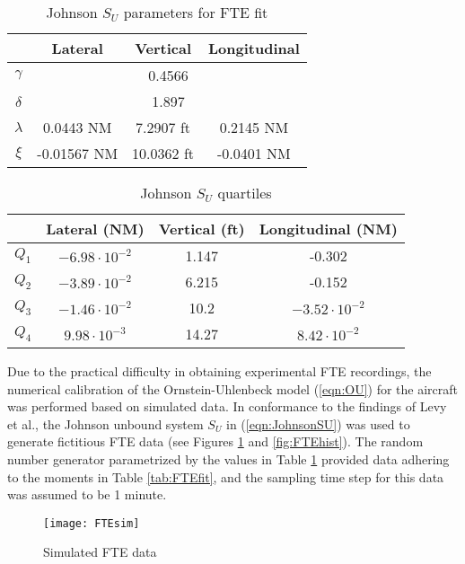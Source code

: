 \documentclass[conference]{IEEEtran}
\begin{document}
\begin{table}
\caption{Johnson $S_U$ parameters for FTE fit}
\label{tab:FTEparam}
\centering
\begin{tabular} {|c|c|c|c|}
\hline\hline
&Lateral&Vertical&Longitudinal \bigstrut\\ \hline\hline
$\gamma$ & \multicolumn{3}{c|}{0.4566} \bigstrut \\ \hline
$\delta$& \multicolumn{3}{c|}{1.897} \bigstrut \\ \hline
$\lambda$&0.0443 NM& 7.2907 ft& 0.2145 NM \bigstrut \\ \hline
$\xi$&-0.01567 NM& 10.0362 ft& -0.0401 NM \bigstrut \\ \hline\hline
\end{tabular}
\end{table}

\begin{table}
\caption{Johnson $S_U$ quartiles}
\label{tab:quant}
\centering
\begin{tabular} {|c|c|c|c|}
\hline\hline
& Lateral (NM) & Vertical (ft) & Longitudinal (NM)\bigstrut\\ \hline\hline
$Q_1$ & $-6.98\cdot10^{-2}$ & 1.147 & -0.302 \bigstrut \\ \hline
$Q_2$ & $-3.89\cdot10^{-2}$ & 6.215 & -0.152 \bigstrut \\ \hline
$Q_3$ & $-1.46\cdot10^{-2}$ & 10.2 & $-3.52\cdot10^{-2}$ \bigstrut \\ \hline
$Q_4$ & $9.98\cdot10^{-3}$ & 14.27 & $8.42\cdot10^{-2}$ \bigstrut \\ \hline\hline
\end{tabular}
\end{table}

Due to the practical difficulty in obtaining experimental FTE recordings, the numerical calibration of the Ornstein-Uhlenbeck model (\ref{eqn:OU}) for the aircraft was performed based on simulated data. In conformance to the findings of Levy et al., the Johnson unbound system $S_U$ in (\ref{eqn:JohnsonSU}) was used to generate fictitious FTE data (see Figures \ref{fig:FTEsim} and  \ref{fig:FTEhist}). The random number generator parametrized by the values in Table \ref{tab:FTEparam} provided data adhering to the moments in Table \ref{tab:FTEfit}, and the sampling time step for this data was assumed to be 1 minute.


\begin{figure}[!h]
\centering
\texttt{[image: FTEsim]}
\caption{Simulated FTE data}
\label{fig:FTEsim}
\end{figure}
\end{document}
